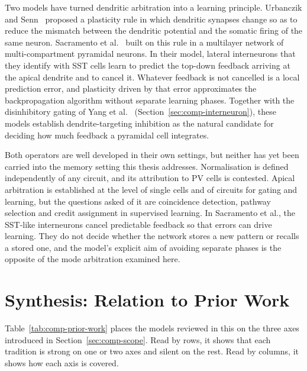 Two models have turned dendritic arbitration into a learning principle.
Urbanczik and Senn~\cite{urbanczik2014learning} proposed a plasticity rule in
which dendritic synapses change so as to reduce the mismatch between the
dendritic potential and the somatic firing of the same neuron. Sacramento et
al.~\cite{sacramento2018dendritic} built on this rule in a multilayer network of
multi-compartment pyramidal neurons. In their model, lateral interneurons that
they identify with SST cells learn to predict the top-down feedback arriving at
the apical dendrite and to cancel it. Whatever feedback is not cancelled is a
local prediction error, and plasticity driven by that error approximates the
backpropagation algorithm without separate learning phases. Together with the
disinhibitory gating of Yang et al.~\cite{yang2016gating}
(Section~\ref{sec:comp-interneuron}), these models establish dendrite-targeting
inhibition as the natural candidate for deciding how much feedback a pyramidal
cell integrates.

Both operators are well developed in their own settings, but neither has yet
been carried into the memory setting this thesis addresses. Normalisation is
defined independently of any circuit, and its attribution to PV cells is
contested. Apical arbitration is established at the level of single cells and
of circuits for gating and learning, but the questions asked of it are
coincidence detection, pathway selection and credit assignment in supervised
learning. In Sacramento et al., the SST-like interneurons cancel predictable
feedback so that errors can drive learning. They do not decide whether the
network stores a new pattern or recalls a stored one, and the model's explicit
aim of avoiding separate phases is the opposite of the mode arbitration
examined here.

\section{Synthesis: Relation to Prior Work}
\label{sec:comp-synthesis}

Table~\ref{tab:comp-prior-work} places the models reviewed in this \unitname{} on the
three axes introduced in Section~\ref{sec:comp-scope}. Read by rows, it shows
that each tradition is strong on one or two axes and silent on the rest. Read by
columns, it shows how each axis is covered.

